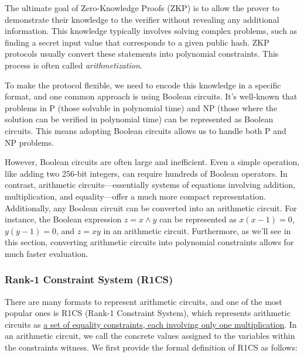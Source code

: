 \documentclass{article}
\begin{document}
The ultimate goal of Zero-Knowledge Proofs (ZKP) is to allow the prover to demonstrate their knowledge to the verifier without revealing any additional information. This knowledge typically involves solving complex problems, such as finding a secret input value that corresponds to a given public hash. ZKP protocols usually convert these statements into polynomial constraints. This process is often called \textit{arithmetization}.

To make the protocol flexible, we need to encode this knowledge in a specific format, and one common approach is using Boolean circuits. It's well-known that problems in P (those solvable in polynomial time) and NP (those where the solution can be verified in polynomial time) can be represented as Boolean circuits. This means adopting Boolean circuits allows us to handle both P and NP problems.

However, Boolean circuits are often large and inefficient. Even a simple operation, like adding two 256-bit integers, can require hundreds of Boolean operators. In contrast, arithmetic circuits—essentially systems of equations involving addition, multiplication, and equality—offer a much more compact representation. Additionally, any Boolean circuit can be converted into an arithmetic circuit. For instance, the Boolean expression $z = x \land y$ can be represented as $x(x-1) = 0$, $y(y-1) = 0$, and $z = xy$ in an arithmetic circuit. Furthermore, as we'll see in this section, converting arithmetic circuits into polynomial constraints allows for much faster evaluation.

\subsubsection{Rank-1 Constraint System (R1CS)}

There are many formats to represent arithmetic circuits, and one of the most popular ones is R1CS (Rank-1 Constraint System), which represents arithmetic circuits as \underline{a set of equality constraints, each involving only one multiplication}. In an arithmetic circuit, we call the concrete values assigned to the variables within the constraints witness. We first provide the formal definition of R1CS as follows:
\end{document}
